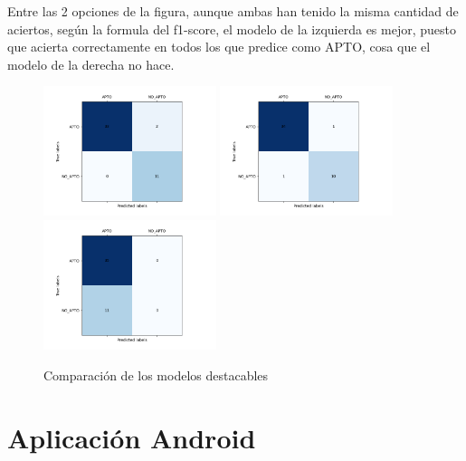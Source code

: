 Entre las 2 opciones de la figura, aunque ambas han tenido la misma cantidad de aciertos, según la formula del f1-score, el modelo de la izquierda es mejor, puesto que acierta correctamente en todos los que predice como APTO, cosa que el modelo de la derecha no hace.

        \begin{figure}[!ht]
                 \centering
                 \includegraphics[width=0.45\textwidth]{img/modelo2-0.003int2_0.9166666720476415_20230603-003149.png}
                 \includegraphics[width=0.45\textwidth]{img/modelo2-0.005int2_0.9090909361839294_20230603-010653.png}
                 \centering
                 \includegraphics[width=0.45\textwidth]{img/modelo2-0.002int1_0_20230610-154306.png}
                  \caption{Comparación de los modelos destacables}
                 \label{fig:comparacion de modelos}
        \end{figure}


\section{Aplicación Android}

